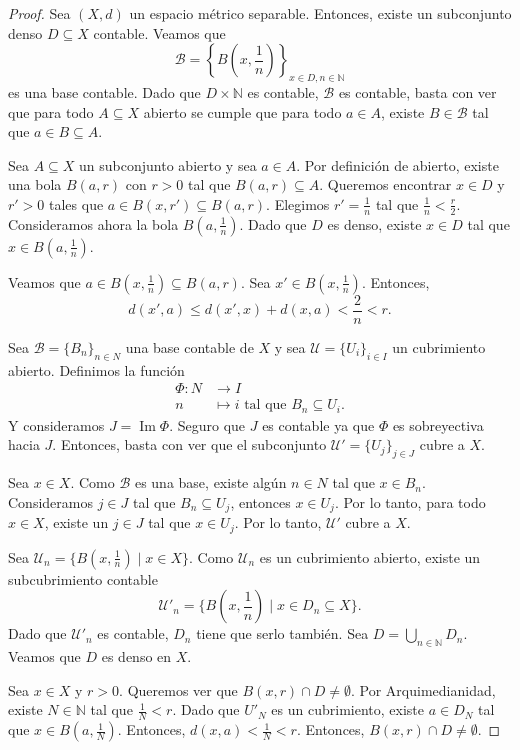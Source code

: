 \begin{proof}
	 Sea $(X, d)$ un espacio métrico separable. Entonces, existe un subconjunto denso $D \subseteq X$ contable. Veamos que
	$$
		\mathcal{B} = \left\{ B\left(x, \frac{1}{n}\right) \right\}_{x \in D, n \in \mathbb{N}}
	$$
	es una base contable. Dado que $D \times \mathbb{N}$ es contable, $\mathcal{B}$ es contable, basta con ver que para todo $A \subseteq X$ abierto se cumple que para todo $a \in A$, existe $B \in \mathcal{B}$ tal que $a \in B \subseteq A$.

	Sea $A \subseteq X$ un subconjunto abierto y sea $a \in A$. Por definición de abierto, existe una bola $B(a, r)$ con $r > 0$ tal que $B(a, r) \subseteq A$. Queremos encontrar $x \in D$ y $r' > 0$ tales que $a \in B(x, r') \subseteq B(a, r)$. Elegimos $r' = \frac{1}{n}$ tal que $\frac{1}{n} < \frac{r}{2}$. Consideramos ahora la bola $B(a, \frac{1}{n})$. Dado que $D$ es denso, existe $x \in D$ tal que $x \in B(a, \frac{1}{n})$.

	Veamos que $a \in B(x, \frac{1}{n}) \subseteq B(a, r)$. Sea $x' \in B(x, \frac{1}{n})$. Entonces,
	$$
		d(x', a) \leq d(x', x) + d(x, a) < \frac{2}{n} < r.
	$$
	\begin{center}
		
	\end{center}

	 Sea $\mathcal{B} = \{ B_n \}_{n \in N}$ una base contable de $X$ y sea $\mathcal{U} = \{ U_i \}_{i \in I}$ un cubrimiento abierto. Definimos la función
	\begin{align*}
		\Phi: N & \to I                                         \\
		n       & \mapsto i \text{ tal que } B_n \subseteq U_i.
	\end{align*}
	Y consideramos $J = \operatorname{Im} \Phi$. Seguro que $J$ es contable ya que $\Phi$ es sobreyectiva hacia $J$. Entonces, basta con ver que el subconjunto $\mathcal{U}' = \{ U_j \}_{j \in J}$ cubre a $X$.

	Sea $x \in X$. Como $\mathcal{B}$ es una base, existe algún $n \in N$ tal que $x \in B_n$. Consideramos $j \in J$ tal que $B_n \subseteq U_j$, entonces $x \in U_j$. Por lo tanto, para todo $x \in X$, existe un $j \in J$ tal que $x \in U_j$. Por lo tanto, $\mathcal{U}'$ cubre a $X$.

	 Sea $\mathcal{U}_n = \{ B(x, \frac{1}{n}) \mid x \in X\}$. Como $\mathcal{U}_n$ es un cubrimiento abierto, existe un subcubrimiento contable
	$$
		\mathcal{U}'_n = \{ B\left(x, \frac{1}{n}\right) \mid x \in D_n \subseteq X\}.
	$$
	Dado que $\mathcal{U}'_n$ es contable, $D_n$ tiene que serlo también. Sea $D = \bigcup_{n \in \mathbb{N}} D_n$. Veamos que $D$ es denso en $X$.

	Sea $x \in X$ y $r > 0$. Queremos ver que $B(x, r) \cap D \neq \emptyset$. Por Arquimedianidad, existe $N \in \mathbb{N}$ tal que $\frac{1}{N} < r$. Dado que $U'_N$ es un cubrimiento, existe $a \in D_N$ tal que $x \in B(a, \frac{1}{N})$. Entonces, $d(x, a) < \frac{1}{N} < r$. Entonces, $B(x, r) \cap D \neq \emptyset$.
\end{proof}

